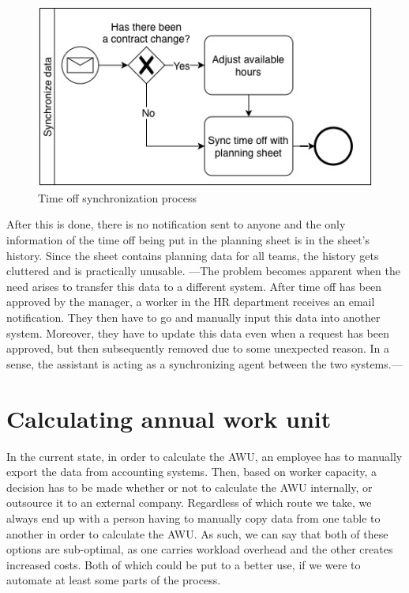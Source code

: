 \documentclass[12pt,oneside]{fithesis2}
\begin{document}
\begin{figure}[H]
    \centering
    \includegraphics[width=\textwidth]{images/sync_vacation_to_gdoc.jpg}
    \caption{Time off synchronization process}
    \label{fig:sync_vacation_to_gdoc}
\end{figure}
After this is done, there is no notification sent to anyone and the only information of the time off being put in the planning sheet is in the sheet's history. Since the sheet contains planning data for all teams, the history gets cluttered and is practically unusable.
\newpage
---The problem becomes apparent when the need arises to transfer this data to a different system. After time off has been approved by the manager, a worker in the HR department receives an email notification. They then have to go and manually input this data into another system. Moreover, they have to update this data even when a request has been approved, but then subsequently removed due to some unexpected reason. In a sense, the assistant is acting as a synchronizing agent between the two systems.---


\section{Calculating annual work unit}
In the current state, in order to calculate the AWU, an employee has to manually export the data from accounting systems. Then, based on worker capacity, a decision has to be made whether or not to calculate the AWU internally, or outsource it to an external company. Regardless of which route we take, we always end up with a person having to manually copy data from one table to another in order to calculate the AWU. As such, we can say that both of these options are sub-optimal, as one carries workload overhead and the other creates increased costs. Both of which could be put to a better use, if we were to automate at least some parts of the process.
\end{document}
